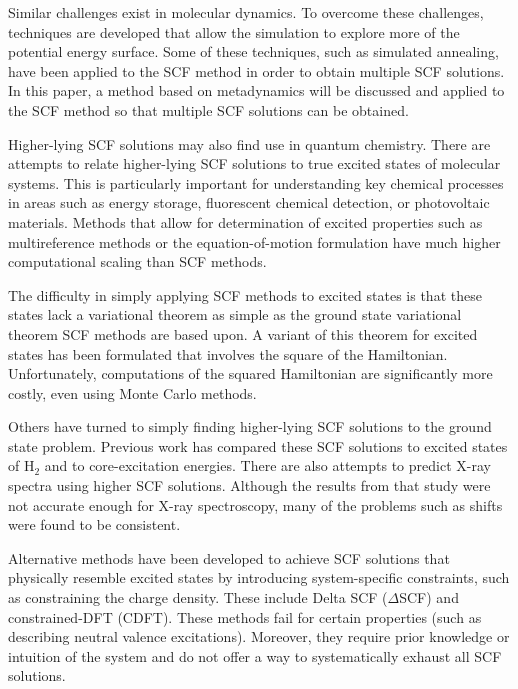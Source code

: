 \documentclass[final,3p,times,twocolumn]{elsarticle}
\begin{document}
Similar challenges exist in molecular dynamics. To overcome these challenges, techniques are developed that allow the simulation to explore more of the potential energy surface. Some of these techniques, such as simulated annealing, have been applied to the SCF method in order to obtain multiple SCF solutions.\cite{malbouisson-2005} In this paper, a method based on metadynamics\cite{parrinello-2002} will be discussed and applied\cite{scfmd} to the SCF method so that multiple SCF solutions can be obtained.

Higher-lying SCF solutions may also find use in quantum chemistry. There are attempts to relate higher-lying SCF solutions to true excited states of molecular systems. %
This is particularly important for understanding key chemical processes in areas such as energy storage,\cite{es-ex1,es-ex2} fluorescent chemical detection,\cite{es-ex3} or photovoltaic materials.\cite{es-ex4,es-ex5} Methods that allow for determination of excited properties such as multireference methods\cite{shavitt} or the equation-of-motion formulation\cite{eomcc} have much higher computational scaling than SCF methods. 

The difficulty in simply applying SCF methods to excited states is that these states lack a variational theorem as simple as the ground state variational theorem SCF methods are based upon. A variant of this theorem for excited states has been formulated that involves the square of the Hamiltonian.\cite{messmer-1969,brett-1972,murakhtanov-1982} Unfortunately, computations of the squared Hamiltonian are significantly more costly, even using Monte Carlo methods.\cite{zhao-2016-1,zhao-2016-2}

Others have turned to simply finding higher-lying SCF solutions to the ground state problem. Previous work has compared these SCF solutions to excited states of H$_2$\cite{gill-2014} and to core-excitation energies.\cite{gill-2009} There are also attempts to predict X-ray spectra using higher SCF solutions.\cite{besley-2013} Although the results from that study were not accurate enough for X-ray spectroscopy, many of the problems such as shifts were found to be consistent. 

Alternative methods have been developed to achieve SCF solutions that physically resemble excited states by introducing system-specific constraints, such as constraining the charge density. These include Delta SCF ($\Delta$SCF)\cite{gunnarsson-1977,gavnholt-2008} and constrained-DFT (CDFT).\cite{cdft} These methods fail for certain properties (such as describing neutral valence excitations). Moreover, they require prior knowledge or intuition of the system and do not offer a way to systematically exhaust all SCF solutions.
\end{document}
